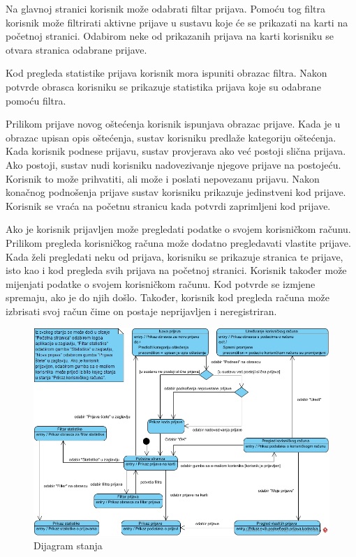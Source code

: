 			Na glavnoj stranici korisnik može odabrati filtar prijava. Pomoću tog filtra korisnik može filtrirati aktivne prijave u sustavu koje će se prikazati na karti na početnoj stranici. Odabirom neke od prikazanih prijava na karti korisniku se otvara stranica odabrane prijave.
			
			Kod pregleda statistike prijava korisnik mora ispuniti obrazac filtra. Nakon potvrde obrasca korisniku se prikazuje statistika prijava koje su odabrane pomoću filtra. 
			
			Prilikom prijave novog oštećenja korisnik ispunjava obrazac prijave. Kada je u obrazac upisan opis oštećenja, sustav korisniku predlaže kategoriju oštećenja. Kada korisnik podnese prijavu, sustav provjerava ako već postoji slična prijava. Ako postoji, sustav nudi korisniku nadovezivanje njegove prijave na postojeću. Korisnik to može prihvatiti, ali može i poslati nepovezanu prijavu. Nakon konačnog podnošenja prijave sustav korisniku prikazuje jedinstveni kod prijave. Korisnik se vraća na početnu stranicu kada potvrdi zaprimljeni kod prijave.
			
			Ako je korisnik prijavljen može pregledati podatke o svojem korisničkom računu. Prilikom pregleda korisničkog računa može dodatno pregledavati vlastite prijave. Kada želi pregledati neku od prijava, korisniku se prikazuje stranica te prijave, isto kao i kod pregleda svih prijava na početnoj stranici. Korisnik također može mijenjati podatke o svojem korisničkom računu. Kod potvrde se izmjene spremaju, ako je do njih došlo. Također, korisnik kod pregleda računa može izbrisati svoj račun čime on postaje neprijavljen i neregistriran.
			
			\begin{figure}[H]
				\includegraphics[width=\textwidth]{slike/dijagramStanja.jpg} %
				\caption{Dijagram stanja}
				\label{fig:dijagramStanja} %
			\end{figure}
			
